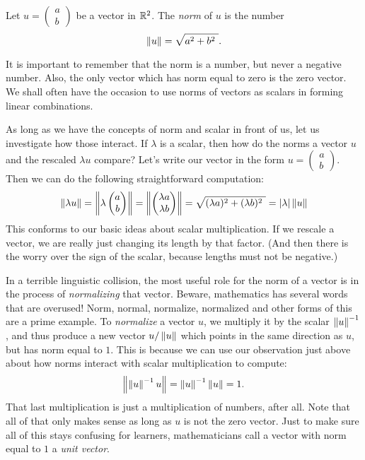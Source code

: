 \documentclass[00-livre-main.tex]{subfiles}
\begin{document}
\begin{definition}
Let $u = \left(\begin{smallmatrix}a \\ b \end{smallmatrix}\right)$ be a vector in $\mathbb{R}^2$.
The \emph{norm} of $u$ is the number
\[
\norm{u} = \sqrt{a^2 + b^2\ }.
\]
\end{definition}

It is important to remember that the norm is a number, but never a negative number. Also, the only vector which has norm equal to zero is the zero vector. We shall often have the occasion to use norms of vectors as scalars in forming linear combinations.

As long as we have the concepts of norm and scalar in front of us, let us investigate how those interact. If $\lambda$ is a scalar, then how do the norms a vector $u$ and the rescaled $\lambda u$ compare? Let's write our vector in the form $u=\left(\begin{smallmatrix} a \\ b \end{smallmatrix}\right)$. Then we can do the following straightforward computation:
\[
\left\|\lambda u\right\| = \left\| \lambda \begin{pmatrix} a \\ b \end{pmatrix}\right\| = \left\| \begin{pmatrix} \lambda a \\ \lambda b \end{pmatrix} \right\| = \sqrt{ (\lambda a)^2 + (\lambda b)^2\ } = |\lambda| \left\|u\right\|
\]
This conforms to our basic ideas about scalar multiplication. If we rescale a vector, we are really just changing its length by that factor. (And then there is the worry over the sign of the scalar, because lengths must not be negative.)


In a terrible linguistic collision, the most useful role for the norm of a vector is in the process of \emph{normalizing} that vector. 
Beware, mathematics has several words that are overused! 
Norm, normal, normalize, normalized and other forms of this are a prime example.
To \emph{normalize} a vector $u$, we multiply it by the scalar $\left\|u\right\|^{-1}$, and thus produce a new vector $u/\left\|u\right\|$ which points in the same direction as $u$, but has norm equal to $1$. This is because we can use our observation just above about how norms interact with scalar multiplication to compute:
\[
\left\|\left\|u\right\|^{-1} u\right\| = \left\|u\right\|^{-1}\left\|u\right\|  = 1.
\]
That last multiplication is just a multiplication of numbers, after all.
Note that all of that only makes sense as long as $u$ is not the zero vector.
Just to make sure all of this stays confusing for learners, mathematicians call a vector with norm equal to $1$ a \emph{unit vector}. 
\end{document}
